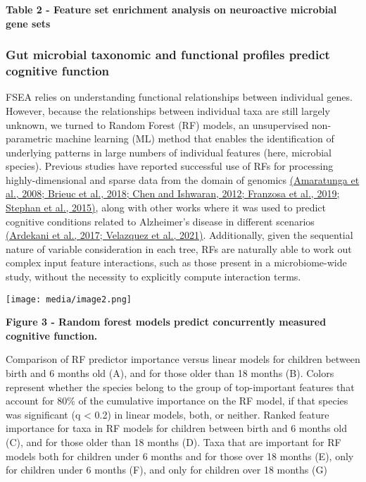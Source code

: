 \textbf{Table 2 - Feature set enrichment analysis on neuroactive
microbial gene sets}

\subsubsection{Gut microbial taxonomic and functional profiles predict cognitive function}

FSEA relies on understanding functional relationships between individual
genes. However, because the relationships between individual taxa are
still largely unknown, we turned to Random Forest (RF) models, an
unsupervised non-parametric machine learning (ML) method that enables
the identification of underlying patterns in large numbers of individual
features (here, microbial species). Previous studies have reported
successful use of RFs for processing highly-dimensional and sparse data
from the domain of genomics
\href{https://www.zotero.org/google-docs/?C3CSPB}{(Amaratunga et al.,
2008; Brieuc et al., 2018; Chen and Ishwaran, 2012; Franzosa et al.,
2019; Stephan et al., 2015)}, along with other works where it was used
to predict cognitive conditions related to Alzheimer's disease in
different scenarios
\href{https://www.zotero.org/google-docs/?GiadGy}{(Ardekani et al.,
2017; Velazquez et al., 2021)}. Additionally, given the sequential
nature of variable consideration in each tree, RFs are naturally able to
work out complex input feature interactions, such as those present in a
microbiome-wide study, without the necessity to explicitly compute
interaction terms.

\texttt{[image: media/image2.png]}

\textbf{Figure 3 - Random forest models predict concurrently measured
cognitive function.}

Comparison of RF predictor importance versus linear models for children
between birth and 6 months old (A), and for those older than 18 months
(B). Colors represent whether the species belong to the group of
top-important features that account for 80\% of the cumulative
importance on the RF model, if that species was significant (q
\textless{} 0.2) in linear models, both, or neither. Ranked feature
importance for taxa in RF models for children between birth and 6 months
old (C), and for those older than 18 months (D). Taxa that are important
for RF models both for children under 6 months and for those over 18
months (E), only for children under 6 months (F), and only for children
over 18 months (G)

